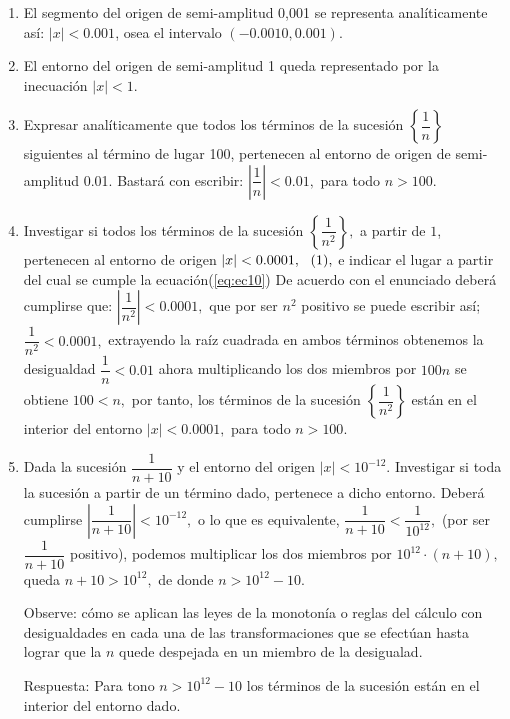 \documentclass[oneside,english,spanish,2m,twoside,svgnames,x11names,HTML,twoside,12pt]{libro-matua}\usepackage[]{graphicx}\usepackage[]{color}
\newcommand{\val}[1]{\left|#1\right|}
\newcommand{\inline}{\refstepcounter{equation}~~\mbox{(\theequation)}}%
\begin{document}
\begin{ejemplos}\label{ej:ejem1}
\begin{enumerate}
\item El segmento del origen de semi-amplitud 0,001 se representa analíticamente
así: $\val{x}<0.001$, osea el intervalo $\left(-0.0010,0.001\right)$.
\item El entorno del origen de semi-amplitud 1 queda representado por la
inecuación $\val{x}<1.$
\item \begin{flushleft}
\label{itm:ej27}Expresar analíticamente que todos los términos de
la sucesión $\left\{ \dfrac{1}{n}\right\} $ siguientes al término
de lugar 100, pertenecen al entorno de origen de semi-amplitud 0.01.\linebreak{}
\sol Bastará con escribir: $\val{\dfrac{1}{n}}<0.01,$ para todo
$n>100.$ \fin
\par\end{flushleft}
\item Investigar si todos los términos de la sucesión $\left\{ \dfrac{1}{n^{2}}\right\} ,$
a partir de $1$, pertenecen al entorno de origen $\val{x}<0.0001,\inline\text{\label{eq:ec10}},$
e indicar el lugar a partir del cual se cumple la ecuación(\foreignlanguage{english}{\ref{eq:ec10}})
\linebreak{}
\sol De acuerdo con el enunciado deberá cumplirse que: $\val{\dfrac{1}{n^{2}}}<0.0001,$
que por ser $n^{2}$ positivo se puede escribir así; $\dfrac{1}{n^{2}}<0.0001,$
extrayendo la raíz cuadrada en ambos términos obtenemos la desigualdad
$\dfrac{1}{n}<0.01$ ahora multiplicando los dos miembros por $100n$
se obtiene $100<n,$ por tanto, los términos de la sucesión $\left\{ \dfrac{1}{n^{2}}\right\} $
están en el interior del entorno $\val{x}<0.0001,$ para todo $n>100.$
\fin
\item \begin{flushleft}
Dada la sucesión $\dfrac{1}{n+10}$ y el entorno del origen $\val{x}<10^{-12}.$
Investigar si toda la sucesión a partir de un término dado, pertenece
a dicho entorno.\linebreak{}
\sol Deberá cumplirse $\val{\dfrac{1}{n+10}}<10^{-12},$ o lo que
es equivalente, $\dfrac{1}{n+10}<\dfrac{1}{10^{12}},$ (por ser $\dfrac{1}{n+10}$
positivo), podemos multiplicar los dos miembros por $10^{12}\cdot(n+10),$
queda $n+10>10^{12},$ de donde $n>10^{12}-10$.\linebreak{}
\vspace*{2pt}\begin{nota}\peque Observe: cómo se aplican las leyes
de la monotonía o reglas del cálculo con desigualdades en cada una
de las transformaciones que se efectúan hasta lograr que la $n$ quede
despejada en un miembro de la desigualad. \end{nota}Respuesta: Para
tono $n>10^{12}-10$ los términos de la sucesión están en el interior
del entorno dado.\fin
\par\end{flushleft}

\end{enumerate}
\end{ejemplos}
\end{document}
